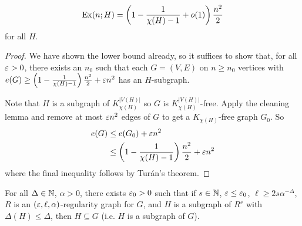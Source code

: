 \documentclass[main.tex]{subfiles}
\begin{document}
\begin{corollary}
  \leavevmode\vspace{-0.5em}
  \[
    \operatorname{Ex}(n;H) = \left(1 - \frac{1}{\chi(H)-1} + o(1)\right)\frac{n^2}{2}
  \]
  for all $H$.
\end{corollary}
\begin{proof}
  We have shown the lower bound already, so it suffices to show that,
  for all $\varepsilon > 0$, there exists an $n_0$ such that each $G = (V,E)$ on
  $n\geq n_0$ vertices with
  $e(G)\geq\left(1 - \frac{1}{\chi(H)-1}\right)\frac{n^2}{2} + \varepsilon n^2$ has
  an $H$-subgraph.

  Note that $H$ is a subgraph of $K_{\chi(H)}^{|V(H)|}$ so $G$ is
  $K_{\chi(H)}^{|V(H)|}$-free.
  Apply the cleaning lemma and remove at most $\varepsilon n^2$ edges of $G$ to get a
  $K_{\chi(H)}$-free graph $G_0$.
  So
  \begin{align*}
    e(G)&\leq e(G_0) + \varepsilon n^2 \\
        &\leq\left(1 - \frac{1}{\chi(H)-1}\right)\frac{n^2}{2} + \varepsilon n^2
  \end{align*}
  where the final inequality follows by Tur\'an's theorem.
\end{proof}
\begin{recall*} %
  For all $\Delta\in\mathbb N$, $\alpha > 0$, there exists $\varepsilon_0 > 0$ such that
  if $s\in\mathbb N$, $\varepsilon\leq\varepsilon_0$, $\ell\geq 2s\alpha^{-\Delta}$, $R$ is an
  $(\varepsilon,\ell,\alpha)$-regularity graph for $G$, and $H$ is a subgraph of $R^s$
  with $\Delta(H)\leq\Delta$, then $H\subseteq G$ (i.e. $H$ is a subgraph of $G$).
\end{recall*}
\end{document}
